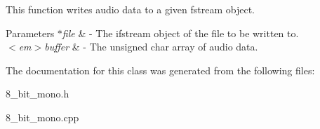 This function writes audio data to a given fstream object. 
\begin{DoxyParams}{Parameters}
{\em $\ast$file} & -\/ The ifstream object of the file to be written to. \\
\hline
{\em $<$em$>$buffer} & -\/ The unsigned char array of audio data. \\
\hline
\end{DoxyParams}


The documentation for this class was generated from the following files\+:\begin{DoxyCompactItemize}
\item 
8\+\_\+bit\+\_\+mono.\+h\item 
8\+\_\+bit\+\_\+mono.\+cpp\end{DoxyCompactItemize}
